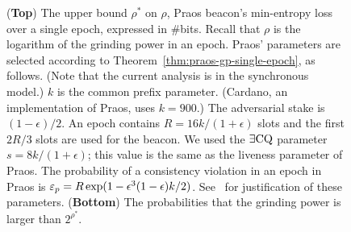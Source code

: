 \begin{figure}[!htb]
  \caption{
    (\textbf{Top}) The upper bound $\rho^*$ on $\rho$, 
    Praos beacon's min-entropy loss over a single epoch, 
    expressed in \#bits.  
    Recall that $\rho$ is the logarithm of the grinding power in an epoch.     
    Praos' parameters are selected according to Theorem~\ref{thm:praos-gp-single-epoch}, 
    as follows.
    (Note that the current analysis is in the synchronous model.)
    $k$ is the common prefix parameter. 
    (Cardano, an implementation of Praos, uses $k = 900$.) 
    The adversarial stake is $(1-\epsilon)/2$.
    An epoch contains $R = 16 k/(1+\epsilon)$ slots and the first $2R/3$ slots are used for the beacon. 
    We used the $\exists\mathrm{CQ}$ parameter $s = 8 k/(1+\epsilon)$; 
    this value is the same as the liveness parameter of Praos. 
    The probability of a consistency violation in an epoch in Praos is 
    $\mathsf{\varepsilon}_p = R \exp(1-\epsilon^3 (1-\epsilon)k/2) $. 
    See~\citet[Theorem 9]{Praos} for justification of these parameters. 
    (\textbf{Bottom}) The probabilities that the grinding power is larger than $2^{\rho^*}$.
  }
  \label{fig:praos-beacon-single-epoch}
\end{figure}
